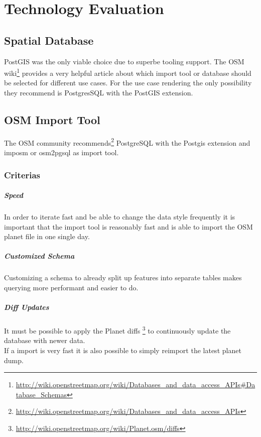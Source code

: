 \chapter{Technology Evaluation}\label{technology_evaluation}

\section{Spatial Database}\label{spatial_database}

PostGIS was the only viable choice due to superbe tooling support. The OSM wiki\footnote{\url{http://wiki.openstreetmap.org/wiki/Databases_and_data_access_APIs\#Database_Schemas}} provides a very helpful article about which import tool or database should be selected for different use cases. For the use case rendering the only possibility they recommend is PostgresSQL with the PostGIS extension. 

\section{OSM Import Tool}\label{osm_import_tool}
The OSM community
recommends\footnote{\url{http://wiki.openstreetmap.org/wiki/Databases_and_data_access_APIs}}
PostgreSQL with the Postgis extension and imposm or osm2pgsql as import tool.

\subsection{Criterias}\label{criterias}

\paragraph{Speed} 
In order to iterate fast and be able to change the data style frequently
it is important that the import tool is reasonably fast and is able
to import the OSM planet file in one single day.

\paragraph{Customized Schema}
Customizing a schema to already split up features into separate tables
makes querying more performant and easier to do.

\paragraph{Diff Updates}
It must be possible to apply the Planet diffs \footnote{\url{http://wiki.openstreetmap.org/wiki/Planet.osm/diffs}} 
to continuously update the database with newer data.
\\
If a import is very fast it is also possible to simply reimport the latest
planet dump.

